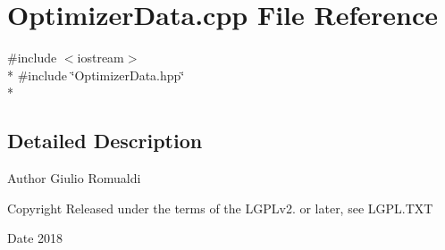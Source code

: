 \section{Optimizer\+Data.\+cpp File Reference}
\label{OptimizerData_8cpp}
{\ttfamily \#include $<$iostream$>$}\\*
{\ttfamily \#include \char`\"{}Optimizer\+Data.\+hpp\char`\"{}}\\*


\subsection{Detailed Description}
\begin{DoxyAuthor}{Author}
Giulio Romualdi 
\end{DoxyAuthor}
\begin{DoxyCopyright}{Copyright}
Released under the terms of the L\+G\+P\+Lv2. or later, see L\+G\+P\+L.\+T\+XT 
\end{DoxyCopyright}
\begin{DoxyDate}{Date}
2018 
\end{DoxyDate}
